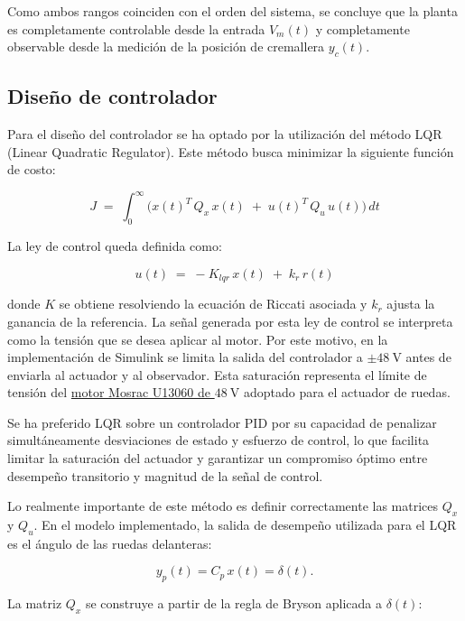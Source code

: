 \documentclass{article}
\begin{document}
Como ambos rangos coinciden con el orden del sistema, se concluye que la planta es completamente controlable desde la entrada $V_m(t)$ y completamente observable desde la medición de la posición de cremallera $y_c(t)$.

\subsection{Diseño de controlador}

Para el diseño del controlador se ha optado por la utilización del método LQR (Linear Quadratic Regulator). Este método busca minimizar la siguiente función de costo:

\begin{equation}
J \;=\; \int_{0}^{\infty}\bigl(x(t)^{T} \, Q_x \, x(t)\;+\;u(t)^{T} \, Q_u \, u(t)\bigr)\,dt
\end{equation}

La ley de control queda definida como:

\begin{equation}
u(t)\;=\;-K_{lqr}\,x(t)\;+\;k_{r}\,r(t)
\end{equation}

donde $K$ se obtiene resolviendo la ecuación de Riccati asociada y $k_{r}$ ajusta la ganancia de la referencia. La señal generada por esta ley de control se interpreta como la tensión que se desea aplicar al motor. Por este motivo, en la implementación de Simulink se limita la salida del controlador a $\pm48\ \mathrm{V}$ antes de enviarla al actuador y al observador. Esta saturación representa el límite de tensión del \hyperlink{ref:mosrac-u13060}{motor Mosrac U13060 de $48\ \mathrm{V}$} adoptado para el actuador de ruedas.

Se ha preferido LQR sobre un controlador PID por su capacidad de penalizar simultáneamente desviaciones de estado y esfuerzo de control, lo que facilita limitar la saturación del actuador y garantizar un compromiso óptimo entre desempeño transitorio y magnitud de la señal de control.

Lo realmente importante de este método es definir correctamente las matrices $Q_x$ y $Q_u$. En el modelo implementado, la salida de desempeño utilizada para el LQR es el ángulo de las ruedas delanteras:

\begin{equation}
y_p(t)=C_p\,x(t)=\delta(t).
\end{equation}

 La matriz $Q_x$ se construye a partir de la regla de Bryson aplicada a $\delta(t)$:
\end{document}
